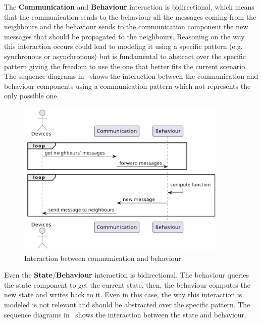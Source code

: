 The \textbf{Communication} and \textbf{Behaviour} interaction is bidirectional, which means that the communication sends to the behaviour all the
messages coming from the neighbours and the behaviour sends to the communication component the new messages that should be propagated
to the neighbours.
Reasoning on the way this interaction occurs could lead to modeling it using a specific pattern (e.g. synchronous or asynchronous) but is fundamental
to abstract over the specific pattern giving the freedom to use the one that better fits the current scenario.
The sequence diagrams in~ shows the interaction between the communication and
behaviour components using a communication pattern which not represents the only possible one.

\begin{figure}
	\centering
	\includegraphics[width=0.9\textwidth]{figures/sequence-diagram-comm.pdf}
	\caption{Interaction between communication and behaviour.}
	\label{fig:framework-components-interaction-2-communication-behaviour}
\end{figure}

Even the \textbf{State}/\textbf{Behaviour} interaction is bidirectional.
The behaviour queries the state component to get the current state, then, the behaviour computes the new state and writes back to it.
Even in this case, the way this interaction is modeled is not relevant and should be abstracted over the specific pattern.
The sequence diagrams in~ shows the interaction between the state and behaviour.

